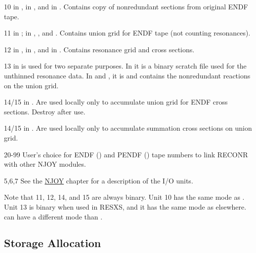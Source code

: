\begin{list}{}{\leftmargin=.75in=.25in=.5in}
\begin{singlespace}

\item[10]  in ,  in
          , and  in .
          Contains copy of nonredundant sections from original
          ENDF tape.
\item[11]  in ;  in
          , , and .
          Contains union grid for ENDF tape (not counting
          resonances).
\item[12]  in ,  in
          , and  in .
          Contains resonance grid and cross sections.
\item[13]  in  is used for two separate
          purposes.  In  it is a binary scratch file
           used for the unthinned resonance data.  In
           and , it
          is  and contains the nonredundant reactions on
          the union grid.
\item[14/15]  in .  Are used locally only
          to accumulate union grid for ENDF cross sections.
          Destroy after use.
\item[14/15]  in .  Are used locally only
          to accumulate summation cross sections on union grid.
\item[20-99] User's choice for ENDF () and PENDF ()
          tape numbers to link RECONR with other NJOY modules.
\item[5,6,7] See the \hyperlink{sNJOYhy}{NJOY} chapter for a
          description of the I/O units.

\end{singlespace}
\end{list}

\noindent
Note that 11, 12, 14, and 15 are always binary.  Unit 10 has the
same mode as .  Unit 13 is binary when used in RESXS, and
it has the same mode as  elsewhere.   can have a
different mode than .

\subsection{Storage Allocation}
\label{ssRECONR_storage}

